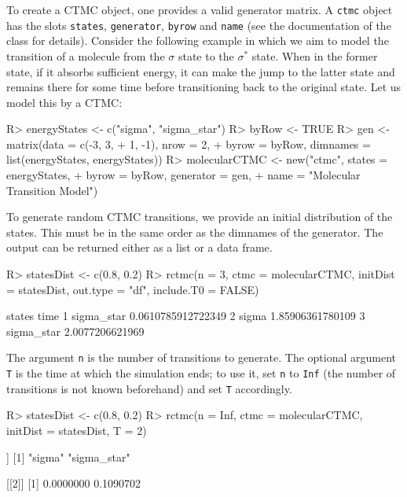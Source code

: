 \documentclass[
  nojss]{jss}
\begin{document}
To create a CTMC object, one provides a valid generator matrix. A \texttt{ctmc} object has the slots \texttt{states}, \texttt{generator}, \texttt{byrow} and \texttt{name} (see the documentation of the class for details). Consider the following example in which we aim to model the transition of a molecule from the \(\sigma\) state to the \(\sigma^*\) state. When in the former state, if it absorbs sufficient energy, it can make the jump to the latter state and remains there for some time before transitioning back to the original state. Let us model this by a CTMC:

\begin{CodeChunk}
\begin{CodeInput}
R> energyStates <- c("sigma", "sigma_star")
R> byRow <- TRUE
R> gen <- matrix(data = c(-3, 3,
+                        1, -1), nrow = 2,
+               byrow = byRow, dimnames = list(energyStates, energyStates))
R> molecularCTMC <- new("ctmc", states = energyStates, 
+                  byrow = byRow, generator = gen, 
+                  name = "Molecular Transition Model")      
\end{CodeInput}
\end{CodeChunk}

To generate random CTMC transitions, we provide an initial distribution of the states. This must be in the same order as the dimnames of the generator. The output can be returned either as a list or a data frame.

\begin{CodeChunk}
\begin{CodeInput}
R> statesDist <- c(0.8, 0.2)
R> rctmc(n = 3, ctmc = molecularCTMC, initDist = statesDist, out.type = "df", include.T0 = FALSE)
\end{CodeInput}
\begin{CodeOutput}
      states               time
1 sigma_star 0.0610785912722349
2      sigma   1.85906361780109
3 sigma_star    2.0077206621969
\end{CodeOutput}
\end{CodeChunk}

The argument \texttt{n} is the number of transitions to generate. The optional argument \texttt{T} is the time at which the simulation ends; to use it, set \texttt{n} to \texttt{Inf} (the number of transitions is not known beforehand) and set \texttt{T} accordingly.

\begin{CodeChunk}
\begin{CodeInput}
R> statesDist <- c(0.8, 0.2)
R> rctmc(n = Inf, ctmc = molecularCTMC, initDist = statesDist, T = 2)
\end{CodeInput}
\begin{CodeOutput}
[[1]]
[1] "sigma"      "sigma_star"

[[2]]
[1] 0.0000000 0.1090702
\end{CodeOutput}
\end{CodeChunk}
\end{document}
